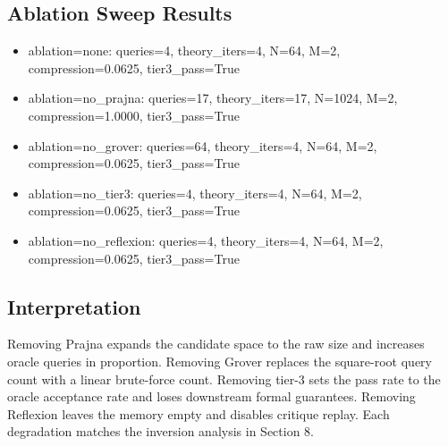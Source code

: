 \subsection{Ablation Sweep Results}
\begin{itemize}
  \item ablation=none: queries=4, theory\_iters=4, N=64, M=2, compression=0.0625, tier3\_pass=True
  \item ablation=no\_prajna: queries=17, theory\_iters=17, N=1024, M=2, compression=1.0000, tier3\_pass=True
  \item ablation=no\_grover: queries=64, theory\_iters=4, N=64, M=2, compression=0.0625, tier3\_pass=True
  \item ablation=no\_tier3: queries=4, theory\_iters=4, N=64, M=2, compression=0.0625, tier3\_pass=True
  \item ablation=no\_reflexion: queries=4, theory\_iters=4, N=64, M=2, compression=0.0625, tier3\_pass=True
\end{itemize}

\subsection{Interpretation}
Removing Prajna expands the candidate space to the raw size and increases oracle queries in proportion. Removing Grover replaces the square-root query count with a linear brute-force count. Removing tier-3 sets the pass rate to the oracle acceptance rate and loses downstream formal guarantees. Removing Reflexion leaves the memory empty and disables critique replay. Each degradation matches the inversion analysis in Section 8.